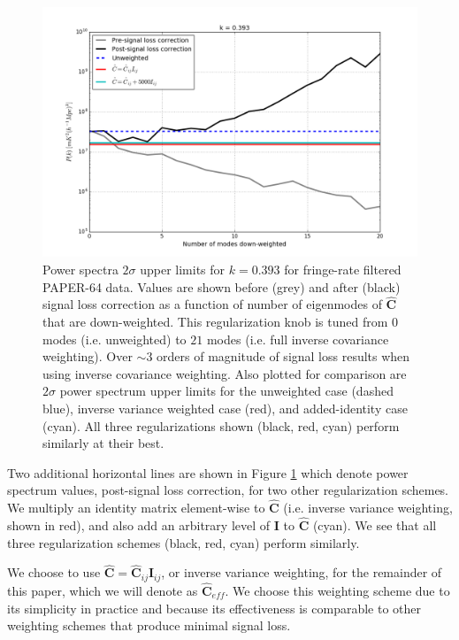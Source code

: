 \documentclass[preprint2,numberedappendix,tighten]{aastex6}  %
\begin{document}
\begin{figure}
	\centering
	\includegraphics[width=1\textwidth]{plots/sigloss_modeloop.png}
	\caption{Power spectra $2\sigma$ upper limits for $k=0.393$ for fringe-rate filtered PAPER-64 data. Values are shown before (grey) and after (black) signal loss correction as a function of number of eigenmodes of $\hat{\textbf{C}}$ that are down-weighted. This regularization knob is tuned from $0$ modes (i.e. unweighted) to $21$ modes (i.e. full inverse covariance weighting). Over $\sim3$ orders of magnitude of signal loss results when using inverse covariance weighting. Also plotted for comparison are $2\sigma$ power spectrum upper limits for the unweighted case (dashed blue), inverse variance weighted case (red), and added-identity case (cyan). All three regularizations shown (black, red, cyan) perform similarly at their best.}
	\label{fig:sigloss_modeloop}
\end{figure}

Two additional horizontal lines are shown in Figure \ref{fig:sigloss_modeloop} which denote power spectrum values, post-signal loss correction, for two other regularization schemes. We multiply an identity matrix element-wise to $\hat{\textbf{C}}$ (i.e. inverse variance weighting, shown in red), and also add an arbitrary level of $\textbf{I}$ to $\hat{\textbf{C}}$ (cyan). We see that all three regularization schemes (black, red, cyan) perform similarly. 

We choose to use $\hat{\textbf{C}} = \hat{\textbf{C}}_{ij}\textbf{I}_{ij}$, or inverse variance weighting, for the remainder of this paper, which we will denote as $\hat{\textbf{C}}_{eff}$. We choose this weighting scheme due to its simplicity in practice and because its effectiveness is comparable to other weighting schemes that produce minimal signal loss.
\end{document}
